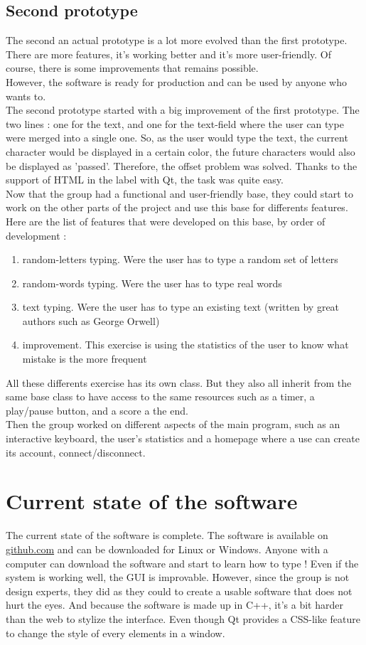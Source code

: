 \documentclass[12pt]{report}
\begin{document}
\section{Second prototype}
The second an actual prototype is a lot more evolved than the first prototype. There are more features, it's working better and it's more user-friendly. Of course, there is some improvements that remains possible.\\
However, the software is ready for production and can be used by anyone who wants to.\\
The second prototype started with a big improvement of the first prototype. The two lines : one for the text, and one for the text-field where the user can type were merged into a single one. So, as the user would type the text, the current character would be displayed in a certain color, the future characters would also be displayed as 'passed'. Therefore, the offset problem was solved. Thanks to the support of HTML in the label with Qt, the task was quite easy.\\
Now that the group had a functional and user-friendly base, they could start to work on the other parts of the project and use this base for differents features.\\
Here are the list of features that were developed on this base, by order of development :
\begin{enumerate}
	\item random-letters typing. Were the user has to type a random set of letters
	\item random-words typing. Were the user has to type real words
	\item text typing. Were the user has to type an existing text (written by great authors such as George Orwell)
	\item improvement. This exercise is using the statistics of the user to know what mistake is the more frequent
\end{enumerate}
All these differents exercise has its own class. But they also all inherit from the same base class to have access to the same resources such as a timer, a play/pause button, and a score a the end.\\
Then the group worked on different aspects of the main program, such as an interactive keyboard, the user's statistics and a homepage where a use can create its account, connect/disconnect.


\chapter{Current state of the software}
The current state of the software is complete. The software is available on \url{github.com} and can be downloaded for Linux or Windows. Anyone with a computer can download the software and start to learn how to type !
Even if the system is working well, the GUI is improvable. However, since the group is not design experts, they did as they could to create a usable software that does not hurt the eyes. And because the software is made up in C++, it's a bit harder than the web to stylize the interface. Even though Qt provides a CSS-like feature to change the style of every elements in a window.
\end{document}

